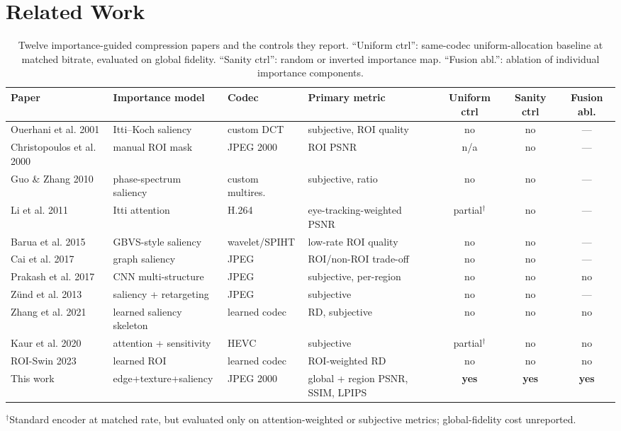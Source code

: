 \documentclass[conference]{IEEEtran}
\begin{document}
\section{Related Work}

\begin{table}[t]
\caption{Twelve importance-guided compression papers and the controls they report.
``Uniform ctrl'': same-codec uniform-allocation baseline at matched bitrate,
evaluated on global fidelity. ``Sanity ctrl'': random or inverted importance map.
``Fusion abl.'': ablation of individual importance components.}
\label{tab:survey}
\begin{center}
\small
\begin{tabular}{llllccc}
\toprule
\textbf{Paper} & \textbf{Importance model} & \textbf{Codec} & \textbf{Primary metric} & \textbf{Uniform ctrl} & \textbf{Sanity ctrl} & \textbf{Fusion abl.} \\
\midrule
Ouerhani et al. 2001 \cite{ouerhani2001adaptive} & Itti--Koch saliency & custom DCT & subjective, ROI quality & no & no & --- \\
Christopoulos et al. 2000 \cite{christopoulos2000jpeg} & manual ROI mask & JPEG 2000 & ROI PSNR & n/a & no & --- \\
Guo \& Zhang 2010 \cite{guo2010visual} & phase-spectrum saliency & custom multires. & subjective, ratio & no & no & --- \\
Li et al. 2011 \cite{li2011visual} & Itti attention & H.264 & eye-tracking-weighted PSNR & partial$^{\dagger}$ & no & --- \\
Barua et al. 2015 \cite{barua2015saliency} & GBVS-style saliency & wavelet/SPIHT & low-rate ROI quality & no & no & --- \\
Cai et al. 2017 \cite{cai2017closed} & graph saliency & JPEG & ROI/non-ROI trade-off & no & no & --- \\
Prakash et al. 2017 \cite{prakash2017msroi} & CNN multi-structure & JPEG & subjective, per-region & no & no & no \\
Z\"und et al. 2013 \cite{zund2013content} & saliency + retargeting & JPEG & subjective & no & no & --- \\
Zhang et al. 2021 \cite{zhang2021attention} & learned saliency skeleton & learned codec & RD, subjective & no & no & no \\
Kaur et al. 2020 \cite{kaur2020regional} & attention + sensitivity & HEVC & subjective & partial$^{\dagger}$ & no & no \\
ROI-Swin 2023 \cite{roiswin2023} & learned ROI & learned codec & ROI-weighted RD & no & no & no \\
This work & edge+texture+saliency & JPEG 2000 & global + region PSNR, SSIM, LPIPS & \textbf{yes} & \textbf{yes} & \textbf{yes} \\
\bottomrule
\end{tabular}
\end{center}
{\footnotesize $^{\dagger}$Standard encoder at matched rate, but evaluated only on
attention-weighted or subjective metrics; global-fidelity cost unreported.}
\end{table}
\end{document}
